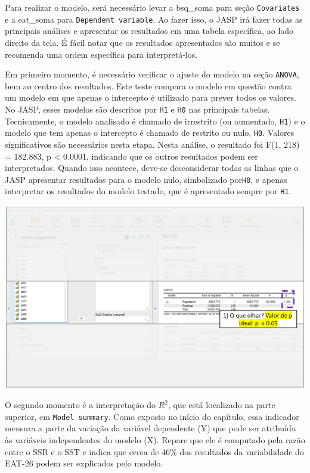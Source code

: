 \documentclass[
]{book}
\begin{document}
Para realizar o modelo, será necessário levar a bsq\_soma para seção \texttt{Covariates} e a eat\_soma para \texttt{Dependent\ variable}. Ao fazer isso, o JASP irá fazer todas as principais análises e apresentar os resultados em uma tabela específica, ao lado direito da tela. É fácil notar que os resultados apresentados são muitos e se recomenda uma ordem específica para interpretá-los.

Em primeiro momento, é necessário verificar o ajuste do modelo na seção \texttt{ANOVA}, bem ao centro dos resultados. Este teste compara o modelo em questão contra um modelo em que apenas o intercepto é utilizado para prever todos os valores. No JASP, esses modelos são descritos por \texttt{H1} e \texttt{H0} nas principais tabelas. Tecnicamente, o modelo analisado é chamado de irrestrito (ou aumentado, \texttt{H1}) e o modelo que tem apenas o intercepto é chamado de restrito ou nulo, \texttt{H0}. Valores significativos são necessários nesta etapa. Nesta análise, o resultado foi F(1, 218) = 182.883, p \textless{} 0.0001, indicando que os outros resultados podem ser interpretados. Quando isso acontece, deve-se desconsiderar todas as linhas que o JASP apresentar resultados para o modelo nulo, simbolizado por\texttt{H0}, e apenas interpretar os resultados do modelo testado, que é apresentado sempre por \texttt{H1}.

\includegraphics{./img/cap_reg_resultados1.png}

O segundo momento é a interpretação do \(R^2\), que está localizado na parte superior, em \texttt{Model\ summary}. Como exposto no início do capítulo, essa indicador mensura a parte da variação da variável dependente (Y) que pode ser atribuída às variáveis independentes do modelo (X). Repare que ele é computado pela razão entre o SSR e o SST e indica que cerca de 46\% dos resultados da variabilidade do EAT-26 podem ser explicados pelo modelo.
\end{document}
